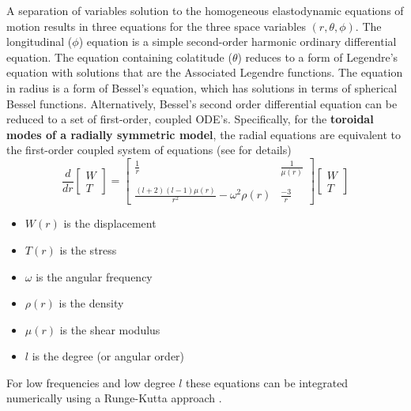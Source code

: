 \documentclass[11pt,titlepage,fleqn]{article}
\begin{document}
A separation of variables solution to the homogeneous elastodynamic equations of motion results in three equations for the three space variables $(r, \theta, \phi)$. The longitudinal ($\phi$) equation is a simple second-order harmonic ordinary differential equation. The equation containing colatitude ($\theta$) reduces to a form of Legendre's equation with solutions that are the Associated Legendre functions. The equation in radius is a form of Bessel's equation, which has solutions in terms of spherical Bessel functions. Alternatively, Bessel's second order differential equation can be reduced to a set of first-order, coupled ODE's. Specifically, for the {\bf toroidal modes of a radially symmetric model}, the radial equations are equivalent to the
first-order coupled system of equations (see  for details)
%
\begin{equation}
\frac{d}{dr}
\left[ \begin{array}{c} W \\ T \end{array} \right]
=
\left[ \begin{array}{cc}
\frac{1}{r} & \frac{1}{\mu(r)} \\
& \\
\frac{(l+2)(l-1)\mu(r)}{r^2}-\omega^2\rho(r) & \frac{-3}{r}
\end{array} \right]
\left[ \begin{array}{c} W \\ T \end{array} \right]
\label{ODEs}
\end{equation}
%
\begin{itemize}
\item $W(r)$ is the displacement
\item $T(r)$ is the stress
\item $\omega$ is the angular frequency
\item $\rho(r)$ is the density
\item $\mu(r)$ is the shear modulus
\item $l$ is the degree (or angular order)
\end{itemize}
%
For low frequencies and low
degree
$l$ these equations can be integrated numerically using a Runge-Kutta approach \citep[\eg][]{Press1988}.
\end{document}
